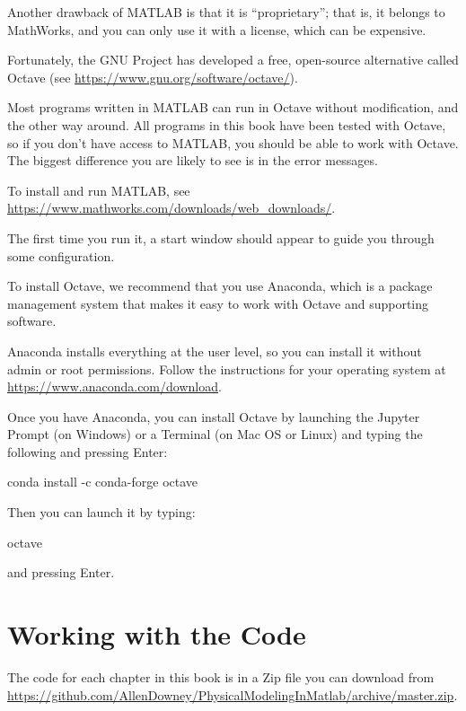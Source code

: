 Another drawback of MATLAB is that it is ``proprietary''; that is, it belongs to MathWorks, and you can only use it with a license, which can be expensive.

Fortunately, the GNU Project has developed a free, open-source alternative called Octave (see \url{https://www.gnu.org/software/octave/}).  

Most programs written in MATLAB can run in Octave without modification, and the other way around.  All programs in this book have been tested with Octave, so if you don't have access to MATLAB, you should be able to work with Octave.  The biggest difference you are likely to see is in the error messages.

To install and run MATLAB, see \url{https://www.mathworks.com/downloads/web_downloads/}.

The first time you run it, a start window should appear to guide you through some configuration.

To install Octave, we recommend that you use Anaconda, which is a package management system that makes it easy to work with Octave and supporting software.

Anaconda installs everything at the user level, so you can install it without admin or root permissions.  Follow the instructions for your operating system at \url{https://www.anaconda.com/download}.

Once you have Anaconda, you can install Octave by launching the Jupyter Prompt (on Windows) or a Terminal (on Mac OS or Linux) and typing the following and pressing Enter:

\begin{code}
conda install -c conda-forge octave
\end{code}

Then you can launch it by typing:

\begin{code}
octave
\end{code}

and pressing Enter.

\section{Working with the Code}



The code for each chapter in this book is in a Zip file you can download from \url{https://github.com/AllenDowney/PhysicalModelingInMatlab/archive/master.zip}.

